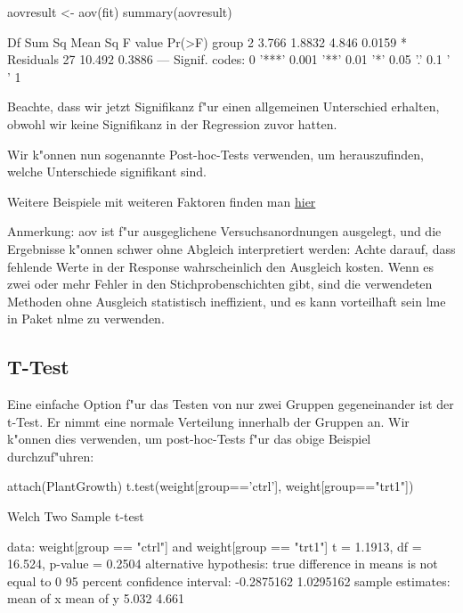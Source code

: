 \documentclass[a4paper,twoside]{tufte-book}\usepackage[]{graphicx}\usepackage[]{color}
\begin{document}
\begin{appendices}
\begin{Schunk}
\begin{Sinput}
aovresult <- aov(fit)
summary(aovresult)
\end{Sinput}
\begin{Soutput}
            Df Sum Sq Mean Sq F value Pr(>F)  
group        2  3.766  1.8832   4.846 0.0159 *
Residuals   27 10.492  0.3886                 
---
Signif. codes:  0 '***' 0.001 '**' 0.01 '*' 0.05 '.' 0.1 ' ' 1
\end{Soutput}
\end{Schunk}

Beachte, dass wir jetzt Signifikanz f"ur einen allgemeinen Unterschied erhalten, obwohl wir keine Signifikanz in der Regression zuvor hatten.

Wir k"onnen nun sogenannte Post-hoc-Tests verwenden, um herauszufinden, welche Unterschiede signifikant sind.

Weitere Beispiele mit weiteren Faktoren finden man \href{http://www.statmethods.net/stats/anova.html}{hier} 


Anmerkung: aov ist f"ur ausgeglichene Versuchsanordnungen ausgelegt, und die Ergebnisse k"onnen schwer ohne Abgleich interpretiert werden: Achte darauf, dass fehlende Werte in der Response wahrscheinlich den Ausgleich kosten. Wenn es zwei oder mehr Fehler in den Stichprobenschichten gibt, sind die verwendeten Methoden ohne Ausgleich statistisch ineffizient, und es kann vorteilhaft sein lme in Paket nlme zu verwenden.

\subsection{T-Test}

Eine einfache Option f"ur das Testen von nur zwei Gruppen gegeneinander ist der t-Test. Er nimmt eine normale Verteilung innerhalb der Gruppen an. Wir k"onnen dies verwenden, um post-hoc-Tests f"ur das obige Beispiel durchzuf"uhren:

\begin{Schunk}
\begin{Sinput}
attach(PlantGrowth)
t.test(weight[group=='ctrl'], weight[group=="trt1"])
\end{Sinput}
\begin{Soutput}

	Welch Two Sample t-test

data:  weight[group == "ctrl"] and weight[group == "trt1"]
t = 1.1913, df = 16.524, p-value = 0.2504
alternative hypothesis: true difference in means is not equal to 0
95 percent confidence interval:
 -0.2875162  1.0295162
sample estimates:
mean of x mean of y 
    5.032     4.661 
\end{Soutput}
\end{Schunk}


\end{appendices}
\end{document}
